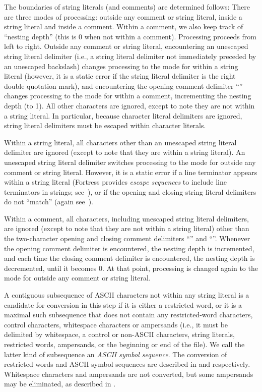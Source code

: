 The boundaries of string literals (and comments)
are determined follows:
There are three modes of processing:
outside any comment or string literal,
inside a string literal
and inside a comment.
Within a comment,
we also keep track of ``nesting depth''
(this is 0 when not within a comment).
Processing proceeds from left to right.
Outside any comment or string literal,
encountering an unescaped string literal delimiter
(i.e., a string literal delimiter not immediately
preceded by an unescaped backslash)
changes processing to the mode for within a string literal
(however, it is a static error if the string literal delimiter
is the right double quotation mark),
and encountering
the opening comment delimiter ``\txt{(*}''
changes processing to the mode for within a comment,
incrementing the nesting depth (to 1).
All other characters are ignored,
except to note they are not within a string literal.
In particular,
because character literal delimiters are ignored,
string literal delimiters must be escaped within
character literals.

Within a string literal,
all characters other than an unescaped string literal delimiter
are ignored
(except to note that they are within a string literal).
An unescaped string literal delimiter switches processing
to the mode for outside any comment or string literal.
However,
it is a static error if a line terminator appears
within a string literal
(Fortress provides \emph{escape sequences}
to include line terminators in strings;
see~),
or if the opening and closing string literal delimiters
do not ``match''
(again see~).

Within a comment,
all characters, including unescaped string literal delimiters, are ignored
(except to note that they are not within a string literal)
other than the two-character opening and closing comment delimiters
``\txt{(*}'' and ``\txt{*)}''.
Whenever the opening comment delimiter is encountered,
the nesting depth is incremented,
and each time the closing comment delimiter is encountered,
the nesting depth is decremented,
until it becomes 0.
At that point, processing is changed again to the mode
for outside any comment or string literal.

A contiguous subsequence of ASCII characters
not within any string literal
is a candidate for conversion in this step
if it is either a restricted word,
or it is a maximal such subsequence
that does not contain any restricted-word characters,
control characters,
whitespace characters
or ampersands
(i.e., it must be delimited by whitespace,
a control or non-ASCII characters,
string literals,
restricted words,
ampersands,
or the beginning or end of the file).
We call the latter kind of subsequence
an \emph{ASCII symbol sequence}.
The conversion of restricted words and ASCII symbol sequences
are described in 
and  respectively.
Whitespace characters and ampersands are not converted,
but some ampersands may be eliminated,
as described in .



